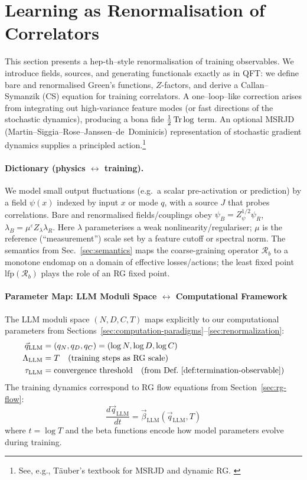 \section{Learning as Renormalisation of Correlators}
\label{sec:llm_rg}

This section presents a hep-th–style renormalisation of training observables.
We introduce fields, sources, and generating functionals exactly as in QFT:
we define bare and renormalised Green's functions, $Z$-factors, and derive a
Callan--Symanzik (CS) equation for training correlators. A one–loop–like
correction arises from integrating out high-variance feature modes (or fast
directions of the stochastic dynamics), producing a bona fide $\tfrac12\Tr\log$
term. An optional MSRJD (Martin--Siggia--Rose--Janssen--de~Dominicis) representation
of stochastic gradient dynamics supplies a principled action.\footnote{See,
e.g., Täuber's textbook for MSRJD and dynamic RG. \cite{TauberCriticalDynamics}} 

\paragraph{Dictionary (physics $\leftrightarrow$ training).}
We model small output fluctuations (e.g.\ a scalar pre-activation or prediction)
by a field $\psi(x)$ indexed by input $x$ or mode $q$, with a source $J$ that
probes correlations. Bare and renormalised fields/couplings obey
$\psi_B = Z_\psi^{1/2}\psi_R$, $\lambda_B=\mu^\varepsilon Z_\lambda \lambda_R$.
Here $\lambda$ parameterises a weak nonlinearity/regulariser; $\mu$ is the
reference (``measurement'') scale set by a feature cutoff or spectral norm.
The semantics from Sec.~\ref{sec:semantics} maps the coarse-graining operator
$\mathcal R_b$ to a monotone endomap on a domain of effective losses/actions;
the least fixed point $\mathrm{lfp}(\mathcal R_b)$ plays the role of an RG
fixed point.

\paragraph{Parameter Map: LLM Moduli Space $\leftrightarrow$ Computational Framework}
The LLM moduli space $(N, D, C, T)$ maps explicitly to our computational parameters from Sections~\ref{sec:computation-paradigms}--\ref{sec:renormalization}:
\begin{align}
\vec{q}_{\text{LLM}} &= (q_N, q_D, q_C) = (\log N, \log D, \log C) \label{eq:llm-q-map} \\
\Lambda_{\text{LLM}} &= T \quad \text{(training steps as RG scale)} \label{eq:llm-lambda-map} \\
\tau_{\text{LLM}} &= \text{convergence threshold} \quad \text{(from Def.~\ref{def:termination-observable})} \label{eq:llm-tau-map}
\end{align}
The training dynamics correspond to RG flow equations from Section~\ref{sec:rg-flow}:
\begin{equation}
\frac{d\vec{q}_{\text{LLM}}}{dt} = \vec{\beta}_{\text{LLM}}(\vec{q}_{\text{LLM}}, T) \label{eq:llm-rg-flow}
\end{equation}
where $t = \log T$ and the beta functions encode how model parameters evolve during training.

